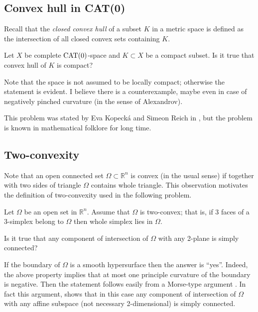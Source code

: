 \subsection*{Convex hull in CAT(0)}
\label{Convex hull in CAT(0)}

Recall that the \emph{closed convex hull} of a subset $K$ in a metric space is defined as the intersection of all closed convex sets containing $K$.


\begin{pr}
Let $X$ be complete $\mathop{\rm CAT}(0)$-space and $K\subset X$ be a compact subset.
Is it true that convex hull of $K$ is compact?
\end{pr}


Note that the space is not assumed to be locally compact; otherwise the statement is evident.
I believe there is a counterexample, maybe even in case of negatively pinched curvature (in the sense of Alexandrov).

This problem was stated by Eva Kopeck\'a and Simeon Reich in \cite[see][]{kopecka-reich}, 
but the problem is known in mathematical folklore for long time. 



\subsection*{Two-convexity}
\label{Two-convexity}

Note that an open connected set $\Omega\subset\mathbb R^n$ is convex (in the usual sense) if together with two sides of triangle $\Omega$ contains whole triangle.
This observation motivates the definition of two-convexity used in the following problem.


\begin{pr}
Let $\Omega$ be an open set in $\mathbb R^n$.
Assume that $\Omega$ is two-convex; that is, if 3 faces of a 3-simplex belong to $\Omega$ then whole simplex lies in $\Omega$.

Is it true that any component of intersection of $\Omega$ with any 2-plane is simply connected?
\end{pr}


If the boundary of $\Omega$ is a smooth hypersurface then the answer is ``yes''.
Indeed, the above property implies that at most one principle curvature of the boundary is negative.
Then the statement follows easily from a Morse-type argument \cite[see Lefschetz theorem in Section~$\tfrac12$ in][]{gromov-SGMC}.
In fact this argument, shows that in this case any component of intersection of $\Omega$ with any affine subspace (not necessary 2-dimensional) is simply connected.

